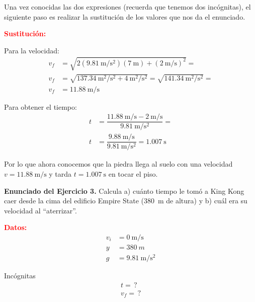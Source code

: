 \documentclass[14pt]{extarticle}
\newcommand{\textocolor}[2]{\textbf{\textcolor{#1}{#2}}}
\begin{document}
Una vez conocidas las dos expresiones (recuerda que tenemos dos incógnitas), el siguiente paso es realizar la sustitución de los valores que nos da el enunciado.

\vspace*{0.5cm}
\noindent
\textocolor{red}{Sustitución:}

Para la velocidad:
\begin{align*}
v_{f} &= \sqrt{2 \left( \SI[per-mode=fraction]{9.81}{\meter\per\square\second} \right) \left( \SI{7}{\meter} \right) + \left( \SI[per-mode=fraction]{2}{\meter\per\second} \right)^{2}} = \\[0.4em] 
v_{f} &= \sqrt{\SI[per-mode=fraction]{137.34}{\square\meter\per\square\second} + \SI[per-mode=fraction]{4}{\square\meter\per\square\second}} = \sqrt{\SI[per-mode=fraction]{141.34}{\square\meter\per\square\second}} = \\[0.4em] 
v_{f} &= \SI[per-mode=fraction]{11.88}{\meter\per\second}
\end{align*}


\vspace*{0.5cm}
\noindent
Para obtener el tiempo:
\begin{align*}
t &= \dfrac{\displaystyle \SI[per-mode=fraction]{11.88}{\meter\per\second} - \SI[per-mode=fraction]{2}{\meter\per\second}}{\displaystyle \SI[per-mode=fraction]{9.81}{\meter\per\square\second}} = \\[0.6em] 
t &= \dfrac{\displaystyle \SI[per-mode=fraction]{9.88}{\meter\per\second}}{\displaystyle \SI[per-mode=fraction]{9.81}{\meter\per\square\second}} = \SI{1.007}{\second}
\end{align*}

Por lo que ahora conocemos que la piedra llega al suelo con una velocidad $v = \SI{11.88}{\meter\per\second}$ y tarda $t = \SI{1.007}{\second}$ en tocar el piso.

\vspace*{0.5cm}
\textbf{Enunciado del Ejercicio 3. } Calcula a) cuánto tiempo le tomó a King Kong caer desde la cima del edificio Empire State (\SI{380}{\meter} de altura) y b) cuál era su velocidad al \enquote{aterrizar}.

\begin{minipage}[t]{0.4\linewidth}
\textocolor{red}{Datos:}
\begin{align*}
v_{i} &= \SI{0}{\meter\per\second} \\[0.5em]
y &= \SI{380}{m} \\[0.5em]
g &= \SI{9.81}{\meter\per\square\second}
\end{align*}
\end{minipage}
\hspace{0.2cm}
\begin{minipage}[t]{0.4\linewidth}
Incógnitas
\begin{align*}
t = \, ? \\[0.5em]
v_{f} = \, ?
\end{align*}
\end{minipage}    
\end{document}
